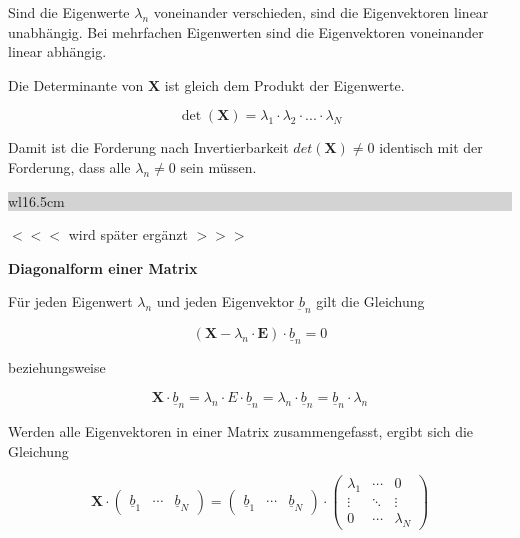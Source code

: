 \noindent Sind die Eigenwerte $\lambda_{n}$ voneinander verschieden, sind die Eigenvektoren linear unabh\"{a}ngig. Bei mehrfachen Eigenwerten sind die Eigenvektoren voneinander linear abh\"{a}ngig.\newline 

\noindent Die Determinante von $\mathbf{X}$ ist gleich dem Produkt der Eigenwerte. 

\begin{equation}\label{eq:thirteenonehundredtwentythree}
\det (\mathbf{X})=\lambda _{1} \cdot \lambda _{2} \cdot ...\cdot \lambda _{N}
\end{equation}

\noindent Damit ist die Forderung nach Invertierbarkeit $det(\mathbf{X}) \neq 0$ identisch mit der Forderung, dass alle $\lambda_{n} \neq 0$ sein m\"{u}ssen. \bigskip

\noindent
\colorbox{lightgray}{%
%
\renewcommand\arraystretch{0.6}%
\begin{tabular}{ wl{16.5cm} }
{\selectfont
{}}
\end{tabular}%
}\medskip

\noindent $<<<$ wird sp\"{a}ter erg\"{a}nzt $>>>$\bigskip

\selectfont
\noindent\textbf{Diagonalform einer Matrix} \smallskip

\noindent F\"{u}r jeden Eigenwert $\lambda_{n}$ und jeden Eigenvektor $\underbar{b}_{n}$ gilt die Gleichung

\begin{equation}\label{eq:thirteenonehundredtwentyfour}
(\mathbf{X}-\lambda _{n} \cdot \mathbf{E})\cdot \underline{b}_{n} =0
\end{equation}

\noindent beziehungsweise 

\begin{equation}\label{eq:thirteenonehundredtwentyfive}
\mathbf{X}\cdot \underline{b}_{n} =\lambda _{n} \cdot E\cdot \underline{b}_{n} =\lambda _{n} \cdot \underline{b}_{n} =\underline{b}_{n} \cdot \lambda _{n}
\end{equation}

\noindent Werden alle Eigenvektoren in einer Matrix zusammengefasst, ergibt sich die Gleichung

\begin{equation}\label{eq:thirteenonehundredtwentysix}
\mathbf{X}\cdot \left(\begin{array}{ccc} {\underline{b}_{1} } & {\cdots } & {\underline{b}_{N} } \end{array}\right)=\left(\begin{array}{ccc} {\underline{b}_{1} } & {\cdots } & {\underline{b}_{N} } \end{array}\right)\cdot \left(\begin{array}{ccc} {\lambda _{1} } & {\cdots } & {0} \\ {\vdots } & {\ddots } & {\vdots } \\ {0} & {\cdots } & {\lambda _{N} } \end{array}\right)
\end{equation}

